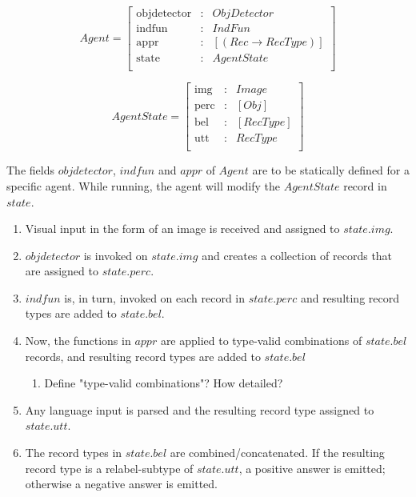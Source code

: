 \documentclass[11pt, a4paper]{article}
\begin{document}
\begin{equation}\label{eq:agent}
Agent = \left[\begin{array}{rcl}
    \text{objdetector} &:& ObjDetector \\
    \text{indfun} &:& IndFun \\
    \text{appr} &:& [(Rec \rightarrow RecType)] \\
    \text{state} &:& AgentState \\
    \end{array}\right]
\end{equation}

\begin{equation}\label{eq:state}
AgentState = \left[\begin{array}{rcl}
    \text{img} &:& Image \\
    \text{perc} &:& [Obj] \\
    \text{bel} &:& [RecType] \\
    \text{utt} &:& RecType \\
    \end{array}\right]
\end{equation}

The fields $objdetector$, $indfun$ and $appr$ of $Agent$ are to be statically defined for a specific agent.
While running, the agent will modify the $AgentState$ record in $state$.

\begin{enumerate}
\item Visual input in the form of an image is received and assigned to $state.img$.
\item $objdetector$ is invoked on $state.img$ and creates a collection of records that are assigned to $state.perc$.
\item $indfun$ is, in turn, invoked on each record in $state.perc$ and resulting record types are added to $state.bel$.
\item Now, the functions in $appr$ are applied to type-valid combinations of $state.bel$ records, and resulting record types are added to $state.bel$
	\begin{enumerate}
	\item Define "type-valid combinations"? How detailed?
	\end{enumerate}
\item Any language input is parsed and the resulting record type assigned to $state.utt$.
\item The record types in $state.bel$ are combined/concatenated. If the resulting record type is a relabel-subtype of $state.utt$, a positive answer is emitted; otherwise a negative answer is emitted.
\end{enumerate}
\end{document}

